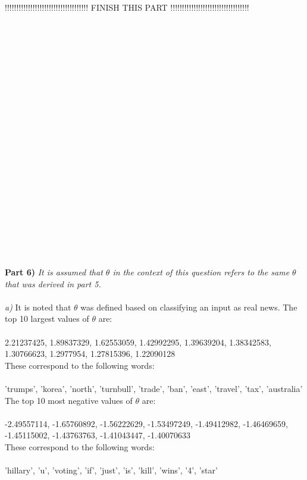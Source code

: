 \documentclass{article}
\begin{document}
!!!!!!!!!!!!!!!!!!!!!!!!!!!!!!!!!!!! FINISH THIS PART !!!!!!!!!!!!!!!!!!!!!!!!!!!!!!!!!!\\\\\\\\\\\\\\\\\\\\\\\\\\\\\\\\\\\\\\\











\\\\
\textbf{Part 6)}
\textit{It is assumed that $\theta$ in the context of this question refers to the same $\theta$ that was derived in part 5.\\\\a)} It is noted that $\theta$ was defined based on classifying an input as real news. The top 10 largest values of $\theta$ are:\\\\
2.21237425, 1.89837329, 1.62553059, 1.42992295, 1.39639204, 1.38342583, 1.30766623, 1.2977954,  1.27815396, 1.22090128\\

These correspond to the following words:\\\\
'trumps', 'korea', 'north', 'turnbull', 'trade', 'ban', 'east', 'travel', 'tax', 'australia'\\

The top 10 most negative values of $\theta$ are:\\\\
-2.49557114, -1.65760892, -1.56222629, -1.53497249, -1.49412982, -1.46469659, -1.45115002, -1.43763763, -1.41043447, -1.40070633\\

These correspond to the following words:\\\\
'hillary', 'u', 'voting', 'if', 'just', 'is', 'kill', 'wins', '4', 'star'\\
\end{document}
